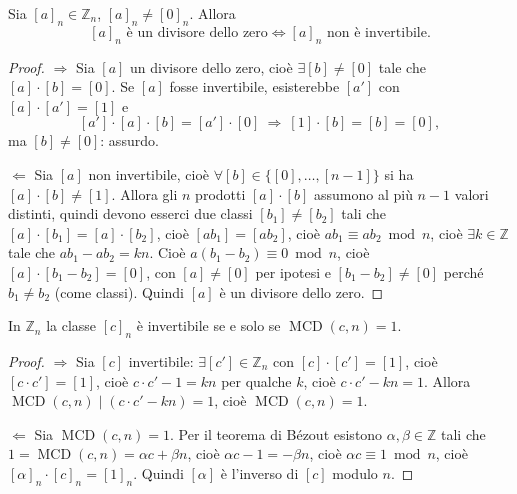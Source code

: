 \documentclass[11pt,a4paper]{article}
\begin{document}
\begin{proposizione}
Sia $[a]_n \in \mathbb{Z}_n$, $[a]_n \neq [0]_n$. Allora
\[
  [a]_n \text{ è un divisore dello zero} \iff [a]_n \text{ non è invertibile.}
\]
\end{proposizione}

\begin{proof}
$\Rightarrow$ Sia $[a]$ un divisore dello zero, cioè $\exists [b] \neq [0]$ tale che $[a]\cdot[b] = [0]$. Se $[a]$ fosse invertibile, esisterebbe $[a']$ con $[a]\cdot[a'] = [1]$ e
\[
  [a']\cdot[a]\cdot[b] = [a']\cdot[0] \ \Rightarrow\ [1]\cdot[b] = [b] = [0] ,
\]
ma $[b] \neq [0]$: assurdo.

$\Leftarrow$ Sia $[a]$ non invertibile, cioè $\forall [b] \in \{[0], \dots, [n-1]\}$ si ha $[a]\cdot[b] \neq [1]$. Allora gli $n$ prodotti $[a]\cdot[b]$ assumono al più $n - 1$ valori distinti, quindi devono esserci due classi $[b_1] \neq [b_2]$ tali che $[a]\cdot[b_1] = [a]\cdot[b_2]$, cioè $[ab_1] = [ab_2]$, cioè $ab_1 \equiv ab_2 \bmod n$, cioè $\exists k \in \mathbb{Z}$ tale che $ab_1 - ab_2 = kn$. Cioè $a(b_1 - b_2) \equiv 0 \bmod n$, cioè $[a]\cdot[b_1 - b_2] = [0]$, con $[a] \neq [0]$ per ipotesi e $[b_1 - b_2] \neq [0]$ perché $b_1 \neq b_2$ (come classi). Quindi $[a]$ è un divisore dello zero.
\end{proof}

\begin{proposizione}
In $\mathbb{Z}_n$ la classe $[c]_n$ è invertibile se e solo se $\operatorname{MCD}(c, n) = 1$.
\end{proposizione}

\begin{proof}
$\Rightarrow$ Sia $[c]$ invertibile: $\exists [c'] \in \mathbb{Z}_n$ con $[c]\cdot[c'] = [1]$, cioè $[c\cdot c'] = [1]$, cioè $c\cdot c' - 1 = kn$ per qualche $k$, cioè $c\cdot c' - kn = 1$. Allora $\operatorname{MCD}(c, n) \mid (c\cdot c' - kn) = 1$, cioè $\operatorname{MCD}(c, n) = 1$.

$\Leftarrow$ Sia $\operatorname{MCD}(c, n) = 1$. Per il teorema di Bézout esistono $\alpha, \beta \in \mathbb{Z}$ tali che $1 = \operatorname{MCD}(c, n) = \alpha c + \beta n$, cioè $\alpha c - 1 = -\beta n$, cioè $\alpha c \equiv 1 \bmod n$, cioè $[\alpha]_n\cdot[c]_n = [1]_n$. Quindi $[\alpha]$ è l'inverso di $[c]$ modulo $n$.
\end{proof}
\end{document}

